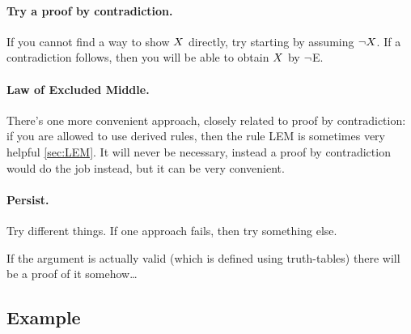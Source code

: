 \paragraph{Try a proof by contradiction.}
If you cannot find a way to show $X$ directly, try starting by assuming $\neg X$. If a contradiction follows, then you will be able to obtain $X$ by $\neg$E.

\paragraph{Law of Excluded Middle.} There's one more convenient approach, closely related to proof by contradiction: if you are allowed to use derived rules, then the rule LEM is sometimes very helpful \cref{sec:LEM}. It will never be necessary, instead a proof by contradiction would do the job instead, but it can be very convenient. 

\paragraph{Persist.}
Try different things. If one approach fails, then try something else.

If the argument is actually valid (which is defined using truth-tables) there will be a proof of it somehow\ldots



\subsection{Example}

